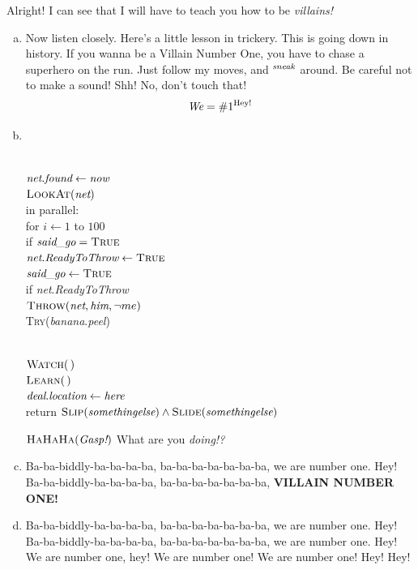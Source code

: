 \documentclass[11pt]{article}
\begin{document}
\begin{solution}[R. Rotten]
Alright! I can see that I will have to teach you how to be \emph{villains!}

\begin{enumerate}[(a)]
\item
Now listen closely.  Here's a little lesson in trickery.  This is going down in history.
If you wanna be a Villain Number One, you have to chase a superhero on the run.  Just follow my moves, and $^{\emph{sneak}}$ around.  Be careful not to make a sound!
Shh!  No, don't touch that!
\[
	\emph{We} = \#1^\text{Hey!}
\]

\item~
\begin{algo}
	\+
\\	$\emph{net}.\emph{found} \gets \emph{now}$
\\	$\textsc{LookAt}(\emph{net})$
\\	in parallel:\+
\\		for $i\gets 1$ to $100$\+
\\			if $\emph{said\_go} = \textsc{True}$\+
\\				$\emph{net}.\emph{ReadyToThrow} \gets \textsc{True}$\-\-
\\		$\emph{said\_go} \gets \textsc{True}$\-
\\[0.5ex]
	if \emph{net}.\emph{ReadyToThrow}\+
\\		$\textsc{Throw}(\emph{net}, \emph{him}, \lnot me)$\-
\\	\textsc{Try}(\emph{banana}.\emph{peel})
\end{algo}

\begin{algo}
	\+
\\	$\textsc{Watch}(\,)$
\\	$\textsc{Learn}(\,)$
\\	$\emph{deal}.\emph{location} \gets \emph{here}$
\\	return $\textsc{Slip}(\emph{somethingelse}) \land
				\textsc{Slide}(\emph{somethingelse})$
\end{algo}

$\text{\textsc{HaHaHa}}(\emph{Gasp!})$   What are you \emph{doing!?}

\item
Ba-ba-biddly-ba-ba-ba-ba, ba-ba-ba-ba-ba-ba-ba, we are number one. Hey!\\
Ba-ba-biddly-ba-ba-ba-ba, ba-ba-ba-ba-ba-ba-ba, \textbf{VILLAIN NUMBER ONE!}

\item
Ba-ba-biddly-ba-ba-ba-ba, ba-ba-ba-ba-ba-ba-ba, we are number one. Hey!\\
Ba-ba-biddly-ba-ba-ba-ba, ba-ba-ba-ba-ba-ba-ba, we are number one. Hey!\\
We are number one, hey!  We are number one!  We are number one!  Hey! Hey!
\end{enumerate}
\end{solution}
\end{document}
